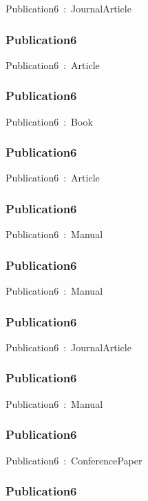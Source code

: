 \documentclass{article}
\begin{document}
Publication6~:~JournalArticle

\subsubsection*{Publication6}

Publication6~:~Article

\subsubsection*{Publication6}

Publication6~:~Book

\subsubsection*{Publication6}

Publication6~:~Article

\subsubsection*{Publication6}

Publication6~:~Manual

\subsubsection*{Publication6}

Publication6~:~Manual

\subsubsection*{Publication6}

Publication6~:~JournalArticle

\subsubsection*{Publication6}

Publication6~:~Manual

\subsubsection*{Publication6}

Publication6~:~ConferencePaper

\subsubsection*{Publication6}
\end{document}
